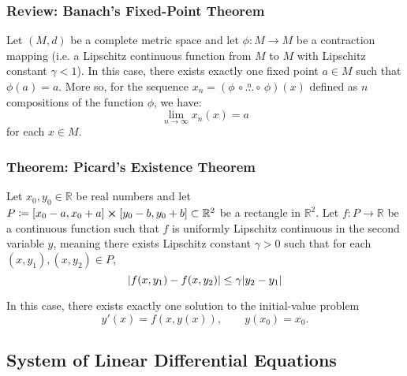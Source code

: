 \documentclass[11pt, a4paper]{article}
\newcommand{\R}{\mathbb{R}} %
\begin{document}
\subsubsection{Review: Banach's Fixed-Point Theorem}
Let $ (M, d) $ be a complete metric space and let $ \phi: M \to M $ be a contraction mapping (i.e. a Lipschitz continuous function from $ M $ to $ M $ with Lipschitz constant $ \gamma < 1 $). In this case, there exists exactly one fixed point $ a \in M $ such that $ \phi(a) = a$. More so, for the sequence $ x_n = (\phi \, \circ \stackrel{n}{\dots} \circ \, \phi)(x) $ defined as $ n $ compositions of the function $ \phi $, we have:
\begin{equation*}
	\lim_{n \to \infty} x_n(x) = a
\end{equation*}
for each $ x \in M $.

\subsubsection{Theorem: Picard's Existence Theorem}
Let $ x_0, y_0 \in \R $ be real numbers and let $ P \coloneqq [x_0 - a, x_0 + a] \cross [y_0 - b, y_0 + b] \subset \R^2 $ be a rectangle in $ \R^2 $. Let $ f : P \to \R $ be a continuous function such that $ f $ is uniformly Lipschitz continuous in the second variable $ y $, meaning there exists Lipschitz constant $ \gamma > 0 $ such that for each $ (x, y_1), (x, y_2) \in P $,
\begin{equation*}
	\abs{f(x, y_1) - f(x, y_2)} \leq \gamma \abs{y_2 - y_1}
\end{equation*}

\iffalse (notation for proof, which is left out)
Finally, let $ \alpha \in [0, 1] $ be a real number, let $ M = \sup_{P}(f) $, and let 
\begin{equation*}
	c \coloneqq \min\left \{a, \frac{b}{M}, \frac{\alpha}{\gamma}\right \}
\end{equation*}
where $ \gamma $ is the Lipschitz constant of the function $ f $. 
\fi 

In this case, there exists exactly one solution to the initial-value problem 
\begin{equation*}
	y'(x) = f(x,y(x)),\qquad y(x_0) = x_0.
\end{equation*}


\subsection{System of Linear Differential Equations}
\end{document}
